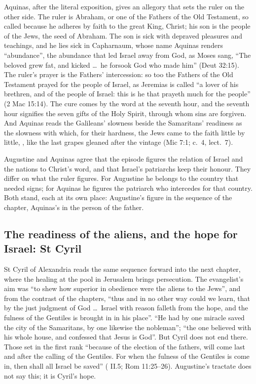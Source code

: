 Aquinas, after the literal exposition, gives an allegory that sets the ruler on
the other side. The ruler is Abraham, or one of the Fathers of the Old
Testament, so called because he adheres by faith to the great King, Christ; his
son is the people of the Jews, the seed of Abraham. The son is sick with
depraved pleasures and teachings, and he lies sick in Capharnaum, whose name
Aquinas renders ``abundance'', the abundance that led Israel away from God, as
Moses sang, ``The beloved grew fat, and kicked \dots\ he forsook God who made
him'' (Deut 32:15). The ruler's prayer is the Fathers' intercession: so too the
Fathers of the Old Testament prayed for the people of Israel, as Jeremias is
called ``a lover of his brethren, and of the people of Israel: this is he that
prayeth much for the people'' (2 Mac 15:14). The cure comes by the word at the
seventh hour, and the seventh hour signifies the seven gifts of the Holy Spirit,
through whom sins are forgiven. And Aquinas reads the Galileans' slowness
beside the Samaritans' readiness as the slowness with which, for their
hardness, the Jews came to the faith little by little, , like the
last grapes gleaned after the vintage (Mic 7:1;  c.~4,
lect.~7).

Augustine and Aquinas agree that the episode figures the relation of Israel and
the nations to Christ's word, and that Israel's patriarchs keep their honour.
They differ on what the ruler figures. For Augustine he belongs to the country
that needed signs; for Aquinas he figures the patriarch who intercedes for that
country. Both stand, each at its own place: Augustine's figure in
the sequence of the chapter, Aquinas's in the person of the father.

\subsection{The readiness of the aliens, and the hope for Israel: St Cyril}

St Cyril of Alexandria reads the same sequence forward into the next chapter,
where the healing at the pool in Jerusalem brings persecution. The evangelist's
aim was ``to shew how superior in obedience were the aliens to the Jews'', and
from the contrast of the chapters, ``thus and in no other way could we learn,
that by the just judgment of God \dots\ Israel with reason falleth from the hope, and the fulness of the Gentiles
is brought in in his place''. ``He had by one miracle saved the city of the
Samaritans, by one likewise the nobleman''; ``the one believed with his whole
house, and confessed that Jesus is God''. But Cyril does not end there. Those
set in the first rank ``because of the election of the fathers, will come last
and after the calling of the Gentiles. For when the fulness of the Gentiles is
come in, then shall all Israel be saved'' ( II.5;
Rom 11:25--26). Augustine's tractate does not say this; it is Cyril's hope.

